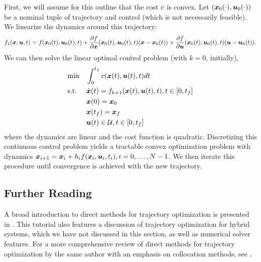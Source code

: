 First, we will assume for this outline that the cost $c$ is convex. Let $(\bm{x}_0(\cdot),\bm{u}_0(\cdot))$ be a nominal tuple of trajectory and control (which is not necessarily feasible). We linearize the dynamics around this trajectory:
\begin{equation}
    f_1(\bm{x},\bm{u},t) = f(\bm{x}_0(t),\bm{u}_0(t),t) + \frac{\partial f}{\partial \bm{x}}(\bm{x}_0(t), \bm{u}_0(t), t) (\bm{x} - \bm{x}_0(t)) + \frac{\partial f}{\partial \bm{u}}(\bm{x}_0(t), \bm{u}_0(t), t) (\bm{u} - \bm{u}_0(t)).
\end{equation}
We can then solve the linear optimal control problem (with $k=0$, initially),
\begin{equation}
\begin{aligned}
\label{eq:ocp}
& {\min} & & \int_{0}^{t_f} c(\bm{x}(t),\bm{u}(t),t) dt\\
& \textrm{s.t.} & & \dot{\bm{x}}(t) = f_{k+1}(\bm{x}(t),\bm{u}(t),t), t \in [0,t_f]\\
& & & \bm{x}(0) = \bm{x}_0\\
& & & \bm{x}(t_f) = \bm{x}_f\\
& & & \bm{u}(t) \in \mathcal{U}, t \in [0,t_f]
\end{aligned}
\end{equation}
where the dynamics are linear and the cost function is quadratic. Discretizing this continuous control problem yields a tractable convex optimization problem with dynamics $\bm{x}_{i+1} = \bm{x}_i + h_i f(\bm{x}_i,\bm{u}_i,t_i), i=0, \ldots, N-1$. We then iterate this procedure until convergence is achieved with the new trajectory.




\subsection{Further Reading}

A broad introduction to direct methods for trajectory optimization is presented in \cite{kelly2017transcription}. This tutorial also features a discussion of trajectory optimization for hybrid systems, which we have not discussed in this section, as well as numerical solver features. For a more comprehensive review of direct methods for trajectory optimization by the same author with an emphasis on collocation methods, see \cite{kelly2017introduction}.